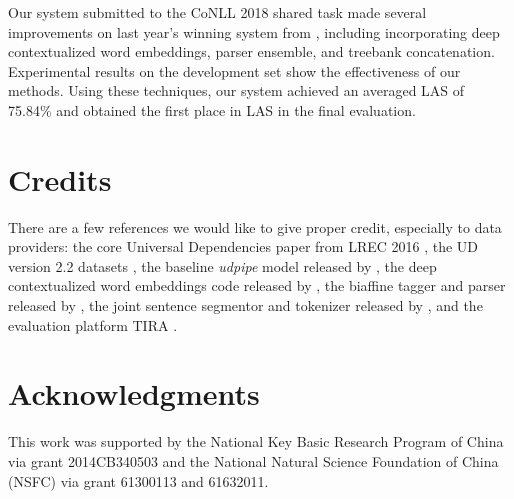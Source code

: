 \documentclass[11pt,a4paper]{article}
\begin{document}
Our system submitted to the CoNLL 2018 shared task made several improvements
on last year's winning system from \citet{dozat-qi-manning:2017:K17-3},
including incorporating deep contextualized word embeddings,
parser ensemble, and treebank concatenation.
Experimental results on the development set show the effectiveness of our methods.
Using  these techniques, our system achieved an averaged LAS of 75.84\%
and obtained the first place in LAS in the final evaluation.

\section{Credits}

There are a few references we would like to
give proper credit, especially to data providers:
the core Universal Dependencies paper from LREC 2016 \cite{ud},
the UD version 2.2 datasets \cite{ud22testdata}, 
the baseline \textit{udpipe} model released by \citet{udpipe},
the deep contextualized word embeddings code released by \citet{N18-1202},
the biaffine tagger and parser released by \citet{dozat-qi-manning:2017:K17-3},
the joint sentence segmentor and tokenizer released by \citet{delhoneux-EtAl:2017:K17-3},
and the evaluation platform TIRA \cite{tira}.

\section*{Acknowledgments}
This work was supported by the National Key Basic Research Program of China
via grant 2014CB340503 and the National Natural Science Foundation of China (NSFC)
via grant 61300113 and 61632011.



\end{document}
